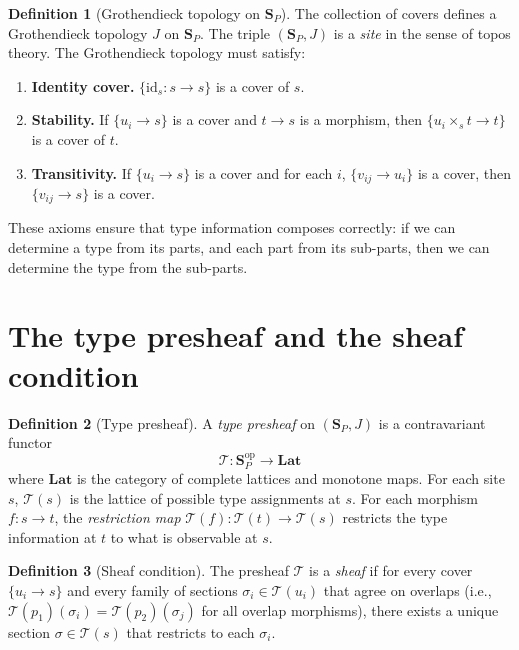 \documentclass[11pt]{report}
\theoremstyle{definition}
\newtheorem{definition}{Definition}[section]
\theoremstyle{plain}
\begin{document}
\begin{definition}[Grothendieck topology on $\mathbf{S}_P$]
The collection of covers defines a Grothendieck topology $J$ on
$\mathbf{S}_P$. The triple $(\mathbf{S}_P, J)$ is a \emph{site} in the
sense of topos theory. The Grothendieck topology must satisfy:
\begin{enumerate}[nosep]
  \item \textbf{Identity cover.} $\{\mathrm{id}_s : s \to s\}$ is a cover
        of $s$.
  \item \textbf{Stability.} If $\{u_i \to s\}$ is a cover and $t \to s$ is
        a morphism, then $\{u_i \times_s t \to t\}$ is a cover of $t$.
  \item \textbf{Transitivity.} If $\{u_i \to s\}$ is a cover and for each
        $i$, $\{v_{ij} \to u_i\}$ is a cover, then $\{v_{ij} \to s\}$ is a
        cover.
\end{enumerate}
\end{definition}

These axioms ensure that type information composes correctly: if we can
determine a type from its parts, and each part from its sub-parts, then we
can determine the type from the sub-parts.

\section{The type presheaf and the sheaf condition}

\begin{definition}[Type presheaf]
A \emph{type presheaf} on $(\mathbf{S}_P, J)$ is a contravariant functor
\[
  \mathcal{T} : \mathbf{S}_P^{\mathrm{op}} \to \mathbf{Lat}
\]
where $\mathbf{Lat}$ is the category of complete lattices and monotone maps.
For each site $s$, $\mathcal{T}(s)$ is the lattice of possible type
assignments at $s$. For each morphism $f : s \to t$, the \emph{restriction
map} $\mathcal{T}(f) : \mathcal{T}(t) \to \mathcal{T}(s)$ restricts the
type information at $t$ to what is observable at $s$.
\end{definition}

\begin{definition}[Sheaf condition]
The presheaf $\mathcal{T}$ is a \emph{sheaf} if for every cover
$\{u_i \to s\}$ and every family of sections $\sigma_i \in \mathcal{T}(u_i)$
that agree on overlaps (i.e., $\mathcal{T}(p_1)(\sigma_i) =
\mathcal{T}(p_2)(\sigma_j)$ for all overlap morphisms), there exists a
unique section $\sigma \in \mathcal{T}(s)$ that restricts to each
$\sigma_i$.
\end{definition}
\end{document}
